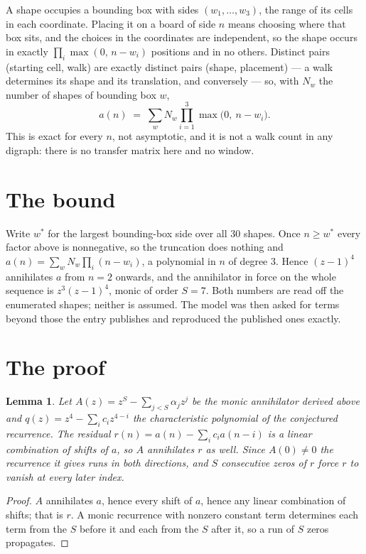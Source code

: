 \documentclass[11pt,a4paper]{article}
\theoremstyle{plain}
\newtheorem{lemma}[theorem]{Lemma}
\theoremstyle{definition}
\begin{document}
A shape occupies a bounding box with sides $(w_1,\dots,w_{3})$, the range of its cells in each
coordinate. Placing it on a board of side $n$ means choosing where that box sits, and the
choices in the coordinates are independent, so the shape occurs in exactly
$\prod_{i}\max(0,\,n-w_i)$ positions and in no others. Distinct pairs (starting cell,
walk) are exactly distinct pairs (shape, placement) --- a walk determines its shape and its
translation, and conversely --- so, with $N_w$ the number of shapes of bounding box $w$,
\[
a(n)\;=\;\sum_{w} N_w \prod_{i=1}^{3}\max\bigl(0,\ n-w_i\bigr).
\]
This is exact for every $n$, not asymptotic, and it is not a walk count in any digraph: there is
no transfer matrix here and no window.

\section{The bound}

Write $w^\ast$ for the largest bounding-box side over all $30$ shapes. Once $n\ge w^\ast$
every factor above is nonnegative, so the truncation does nothing and
$a(n)=\sum_w N_w\prod_i(n-w_i)$, a polynomial in $n$ of degree $3$. Hence $(z-1)^{4}$
annihilates $a$ from $n=2$ onwards, and the annihilator in force on the whole sequence is
$z^{3}(z-1)^{4}$, monic of order $S=7$. Both numbers are read off the enumerated
shapes; neither is assumed. The model was then asked for terms beyond those the entry publishes
and reproduced the published ones exactly.

\section{The proof}

\begin{lemma}\label{lem:crit}
Let $A(z)=z^S-\sum_{j<S}\alpha_jz^{j}$ be the monic annihilator derived above and
$q(z)=z^{4}-\sum_ic_iz^{4-i}$ the characteristic polynomial of the conjectured
recurrence. The residual $r(n)=a(n)-\sum_ic_ia(n-i)$ is a linear combination of shifts of $a$,
so $A$ annihilates $r$ as well. Since $A(0)\ne0$ the recurrence it gives runs in both
directions, and $S$ consecutive zeros of $r$ force $r$ to vanish at every later index.
\end{lemma}

\begin{proof}
$A$ annihilates $a$, hence every shift of $a$, hence any linear combination of shifts; that is
$r$. A monic recurrence with nonzero constant term determines each term from the $S$ before it
and each from the $S$ after it, so a run of $S$ zeros propagates.
\end{proof}
\end{document}

